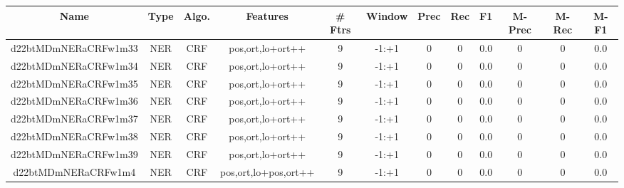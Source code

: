 \documentclass[a4paper]{article}
\begin{document}
\begin{landscape}
\begin{center}
\begin{tabular}{ |c|c|c|c|c|c|c|c|c|c|c|c|} 
 \hline
 	Name & Type & Algo. & Features & \# Ftrs & Window & Prec & Rec & F1 & M-Prec & M-Rec & M-F1\\
 \hline

 	

 
 	
 	\small{ d22btMDmNERaCRFw1m33 } & \small{ NER} & \small{  CRF }  & pos,ort,lo+ort++  &  9 &  \small{  -1:+1 }  &  0 & 0 & 0.0  &  0 & 0 & 0.0 \\
 	

 
 	
 	\small{ d22btMDmNERaCRFw1m34 } & \small{ NER} & \small{  CRF }  & pos,ort,lo+ort++  &  9 &  \small{  -1:+1 }  &  0 & 0 & 0.0  &  0 & 0 & 0.0 \\
 	

 
 	
 	\small{ d22btMDmNERaCRFw1m35 } & \small{ NER} & \small{  CRF }  & pos,ort,lo+ort++  &  9 &  \small{  -1:+1 }  &  0 & 0 & 0.0  &  0 & 0 & 0.0 \\
 	

 
 	
 	\small{ d22btMDmNERaCRFw1m36 } & \small{ NER} & \small{  CRF }  & pos,ort,lo+ort++  &  9 &  \small{  -1:+1 }  &  0 & 0 & 0.0  &  0 & 0 & 0.0 \\
 	

 
 	
 	\small{ d22btMDmNERaCRFw1m37 } & \small{ NER} & \small{  CRF }  & pos,ort,lo+ort++  &  9 &  \small{  -1:+1 }  &  0 & 0 & 0.0  &  0 & 0 & 0.0 \\
 	

 
 	
 	\small{ d22btMDmNERaCRFw1m38 } & \small{ NER} & \small{  CRF }  & pos,ort,lo+ort++  &  9 &  \small{  -1:+1 }  &  0 & 0 & 0.0  &  0 & 0 & 0.0 \\
 	

 
 	
 	\small{ d22btMDmNERaCRFw1m39 } & \small{ NER} & \small{  CRF }  & pos,ort,lo+ort++  &  9 &  \small{  -1:+1 }  &  0 & 0 & 0.0  &  0 & 0 & 0.0 \\
 	

 
 	
 	\small{ d22btMDmNERaCRFw1m4 } & \small{ NER} & \small{  CRF }  & pos,ort,lo+pos,ort++  &  9 &  \small{  -1:+1 }  &  0 & 0 & 0.0  &  0 & 0 & 0.0 \\
 	


\end{tabular}
\end{center}
\end{landscape}
\end{document}
